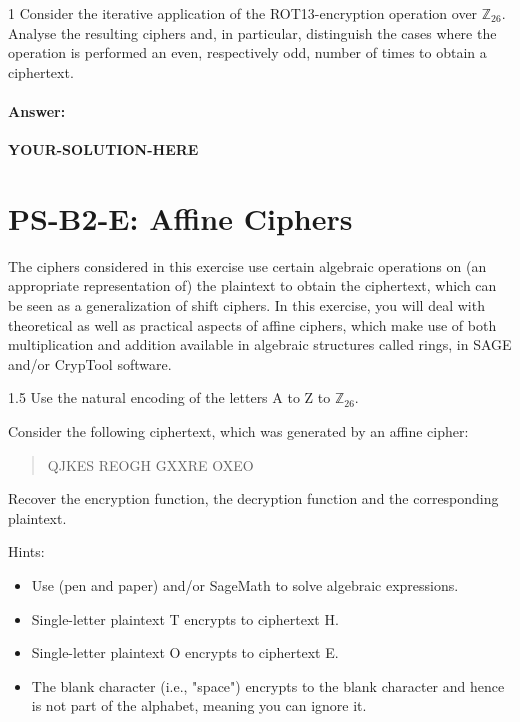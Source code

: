 \documentclass[]{scrartcl}
\newcommand{\ZZ}{\mathbb{Z}}
\newcounter{exercise}
\newcounter{qid}[section]
\newcommand{\exerciseprefix}{prefix}
\newcommand{\questiontitle}{Questions}
\newcommand{\blockid}{B2}
\newcommand{\exname}{}
\newcommand{\yoursolutionhere}{\textbf{YOUR-SOLUTION-HERE}}
\begin{document}
\renewcommand{\exerciseprefix}{PS-\blockid{}-E\theexercise: \exname-Q\theqid}
\renewcommand{\questiontitle}{\exerciseprefix{}: ROT13 properties}
\begin{exercisebox}{1}
Consider the iterative application of the ROT13-encryption operation over $\ZZ_{26}$. Analyse the resulting ciphers and, in particular, distinguish the cases where the operation is performed an even, respectively odd, number of times to obtain a ciphertext. 
\end{exercisebox}

\paragraph{Answer:} \yoursolutionhere{}



\pagebreak
{}
\renewcommand{\exname}{Affine Ciphers}
\section*{PS-\blockid{}-E\theexercise: Affine Ciphers}
The ciphers considered in this exercise use certain algebraic operations on (an appropriate representation of) the plaintext to obtain the ciphertext, which can be seen as a generalization of shift ciphers. In this exercise, you will deal with theoretical as well as practical aspects of affine ciphers, which make use of both multiplication and addition available in algebraic structures called rings, in SAGE and/or CrypTool software. 




\renewcommand{\exerciseprefix}{PS-\blockid{}-E\theexercise: \exname-Q\theqid}
\renewcommand{\questiontitle}{\exerciseprefix{}: Algebraic attack}
\begin{exercisebox}{1.5}
Use the natural encoding of the letters A to Z to $\ZZ_{26}$. \newline

Consider the following ciphertext, which was generated by an affine cipher:
\begin{quote}
    QJKES REOGH GXXRE OXEO
\end{quote}
Recover the encryption function, the decryption function and the corresponding plaintext. 

{\small Hints:
\begin{itemize}
    \item Use (pen and paper) and/or SageMath to solve algebraic expressions. 
    \item Single-letter plaintext T encrypts to ciphertext H. 
    \item Single-letter plaintext O encrypts to ciphertext E. 
    \item The blank character (i.e., "space") encrypts to the blank character and hence is not part of the alphabet, meaning you can ignore it. 
\end{itemize}}
\end{exercisebox}
\end{document}
